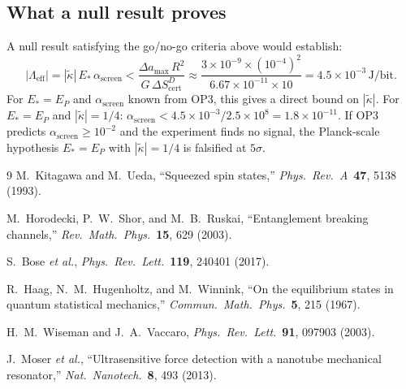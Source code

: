 \documentclass[11pt,letterpaper]{article}
\newcommand{\kt}{\tilde{\kappa}}
\newcommand{\Scert}{S_{\mathrm{cert}}}
\newcommand{\Leff}{\Lambda_{\mathrm{eff}}}
\newcommand{\asc}{\alpha_{\mathrm{screen}}}
\begin{document}
\subsection{What a null result proves}

A null result satisfying the go/no-go criteria above would establish:
\begin{equation}
  |\Leff| = |\kt|\,E_*\,\asc
  < \frac{\Delta a_{\max}\,R^2}{G\,\Delta\Scert^D}
  \approx \frac{3\times10^{-9} \times (10^{-4})^2}{6.67\times10^{-11}\times10}
  = 4.5\times10^{-3}\,\text{J/bit}.
\end{equation}
For $E_* = E_P$ and $\asc$ known from OP3, this gives a direct bound on $|\kt|$.
For $E_* = E_P$ and $|\kt| = 1/4$: $\asc < 4.5\times10^{-3}/2.5\times10^8 = 1.8\times10^{-11}$.
If OP3 predicts $\asc \geq 10^{-2}$ and the experiment finds no signal, the Planck-scale
hypothesis $E_* = E_P$ with $|\kt| = 1/4$ is falsified at $5\sigma$.

\begin{thebibliography}{9}
M.~Kitagawa and M.~Ueda,
``Squeezed spin states,''
\textit{Phys.\ Rev.\ A}\ \textbf{47}, 5138 (1993).

M.~Horodecki, P.~W.~Shor, and M.~B.~Ruskai,
``Entanglement breaking channels,''
\textit{Rev.\ Math.\ Phys.}\ \textbf{15}, 629 (2003).

S.~Bose \textit{et al.},
\textit{Phys.\ Rev.\ Lett.}\ \textbf{119}, 240401 (2017).

R.~Haag, N.~M.~Hugenholtz, and M.~Winnink,
``On the equilibrium states in quantum statistical mechanics,''
\textit{Commun.\ Math.\ Phys.}\ \textbf{5}, 215 (1967).

H.~M.~Wiseman and J.~A.~Vaccaro,
\textit{Phys.\ Rev.\ Lett.}\ \textbf{91}, 097903 (2003).

J.~Moser \textit{et al.},
``Ultrasensitive force detection with a nanotube mechanical resonator,''
\textit{Nat.\ Nanotech.}\ \textbf{8}, 493 (2013).
\end{thebibliography}
\end{document}

